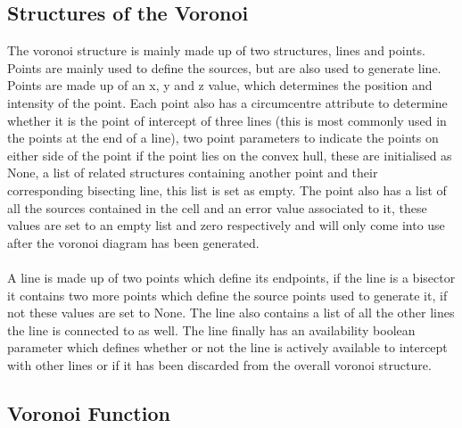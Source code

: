 \subsection{Structures of the Voronoi}
The voronoi structure is mainly made up of two structures, lines and points. Points are mainly used to define the sources, but are also used to generate line. Points are made up of an x, y and z value, which determines the position and intensity of the point. Each point also has a circumcentre attribute to determine whether it is the point of intercept of three lines (this is most commonly used in the points at the end of a line), two point parameters to indicate the points on either side of the point if the point lies on the convex hull, these are initialised as None, a list of related structures containing another point and their corresponding bisecting line, this list is set as empty. The point also has a list of all the sources contained in the cell and an error value associated to it, these values are set to an empty list and zero respectively and will only come into use after the voronoi diagram has been generated.
\\
\\
A line is made up of two points which define its endpoints, if the line is a bisector it contains two more points which define the source points used to generate it, if not these values are set to None. The line also contains a list of all the other lines the line is connected to as well. The line finally has an availability boolean parameter which defines whether or not the line is actively available to intercept with other lines or if it has been discarded from the overall voronoi structure.

\subsection{Voronoi Function}

